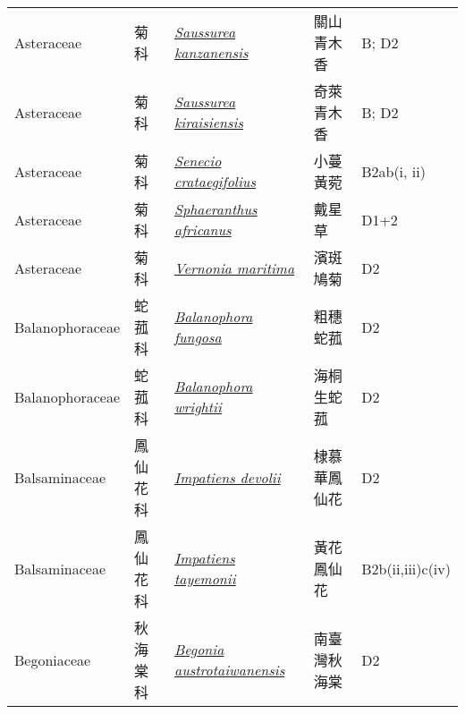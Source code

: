 {\begin{longtable}{p{2.5cm}p{2cm}p{5cm}p{2.5cm}p{3cm}}
    Asteraceae & 菊科 & \href{http://www.theplantlist.org/tpl1.1/search?q=Saussurea+kanzanensis}{\textit{Saussurea kanzanensis} } & 關山青木香 & B; D2 \index{Saussurea@\textit{Saussurea}!kanzanensis@\textit{kanzanensis}}  \index{關山青木香} \\
    Asteraceae & 菊科 & \href{http://www.theplantlist.org/tpl1.1/search?q=Saussurea+kiraisiensis}{\textit{Saussurea kiraisiensis} } & 奇萊青木香 & B; D2 \index{Saussurea@\textit{Saussurea}!kiraisiensis@\textit{kiraisiensis}}  \index{奇萊青木香} \\
    Asteraceae & 菊科 & \href{http://www.theplantlist.org/tpl1.1/search?q=Senecio+crataegifolius}{\textit{Senecio crataegifolius} } & 小蔓黃菀 & B2ab(i, ii) \index{Senecio@\textit{Senecio}!crataegifolius@\textit{crataegifolius}}  \index{小蔓黃菀} \\
    Asteraceae & 菊科 & \href{http://www.theplantlist.org/tpl1.1/search?q=Sphaeranthus+africanus}{\textit{Sphaeranthus africanus} } & 戴星草 & D1+2 \index{Sphaeranthus@\textit{Sphaeranthus}!africanus@\textit{africanus}}  \index{戴星草} \\
    Asteraceae & 菊科 & \href{http://www.theplantlist.org/tpl1.1/search?q=Vernonia+maritima}{\textit{Vernonia maritima} } & 濱斑鳩菊 & D2 \index{Vernonia@\textit{Vernonia}!maritima@\textit{maritima}}  \index{濱斑鳩菊} \\
    Balanophoraceae & 蛇菰科 & \href{http://www.theplantlist.org/tpl1.1/search?q=Balanophora+fungosa}{\textit{Balanophora fungosa} } & 粗穗蛇菰 & D2 \index{Balanophora@\textit{Balanophora}!fungosa@\textit{fungosa}}  \index{粗穗蛇菰} \\
    Balanophoraceae & 蛇菰科 & \href{http://www.theplantlist.org/tpl1.1/search?q=Balanophora+wrightii}{\textit{Balanophora wrightii} } & 海桐生蛇菰 & D2 \index{Balanophora@\textit{Balanophora}!wrightii@\textit{wrightii}}  \index{海桐生蛇菰} \\
    Balsaminaceae & 鳳仙花科 & \href{http://www.theplantlist.org/tpl1.1/search?q=Impatiens+devolii}{\textit{Impatiens devolii} } & 棣慕華鳳仙花 & D2 \index{Impatiens@\textit{Impatiens}!devolii@\textit{devolii}}  \index{棣慕華鳳仙花} \\
    Balsaminaceae & 鳳仙花科 & \href{http://www.theplantlist.org/tpl1.1/search?q=Impatiens+tayemonii}{\textit{Impatiens tayemonii} } & 黃花鳳仙花 & B2b(ii,iii)c(iv) \index{Impatiens@\textit{Impatiens}!tayemonii@\textit{tayemonii}}  \index{黃花鳳仙花} \\
    Begoniaceae & 秋海棠科 & \href{http://www.theplantlist.org/tpl1.1/search?q=Begonia+austrotaiwanensis}{\textit{Begonia austrotaiwanensis} } & 南臺灣秋海棠 & D2 \index{Begonia@\textit{Begonia}!austrotaiwanensis@\textit{austrotaiwanensis}}  \index{南臺灣秋海棠} \\

\end{longtable}}

